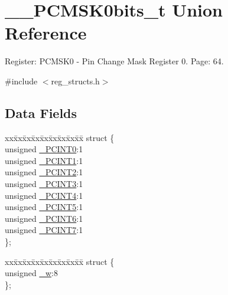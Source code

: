 \hypertarget{union_____p_c_m_s_k0bits__t}{\section{\+\_\+\+\_\+\+P\+C\+M\+S\+K0bits\+\_\+t Union Reference}
\label{union_____p_c_m_s_k0bits__t}
}


Register\+: P\+C\+M\+S\+K0 -\/ Pin Change Mask Register 0. Page\+: 64.  




{\ttfamily \#include $<$reg\+\_\+structs.\+h$>$}

\subsection*{Data Fields}
\begin{DoxyCompactItemize}
\item 
\begin{tabbing}
xx\=xx\=xx\=xx\=xx\=xx\=xx\=xx\=xx\=\kill
struct \{\\
\>unsigned \hyperlink{union_____p_c_m_s_k0bits__t_a4c36533599743b77040f39aa26565e9c}{\_PCINT0}:1\\
\>unsigned \hyperlink{union_____p_c_m_s_k0bits__t_a9d2626d7fe2b7978ad946dfbeefbd3fe}{\_PCINT1}:1\\
\>unsigned \hyperlink{union_____p_c_m_s_k0bits__t_a784b351c789bc209abe8ff338f228b82}{\_PCINT2}:1\\
\>unsigned \hyperlink{union_____p_c_m_s_k0bits__t_afbb36961ce199b7dd0ab29a6f5362998}{\_PCINT3}:1\\
\>unsigned \hyperlink{union_____p_c_m_s_k0bits__t_aa046bde236a4c86e2e9c21973d249e9c}{\_PCINT4}:1\\
\>unsigned \hyperlink{union_____p_c_m_s_k0bits__t_a56d89760d15b21dd0e098c19b4dc8916}{\_PCINT5}:1\\
\>unsigned \hyperlink{union_____p_c_m_s_k0bits__t_a7f3ed66de68e3fd0b7dc7f19ab7c3565}{\_PCINT6}:1\\
\>unsigned \hyperlink{union_____p_c_m_s_k0bits__t_ac895fc43c5e5d26b106c816161738358}{\_PCINT7}:1\\
\}; \\

\end{tabbing}\item 
\begin{tabbing}
xx\=xx\=xx\=xx\=xx\=xx\=xx\=xx\=xx\=\kill
struct \{\\
\>unsigned \hyperlink{union_____p_c_m_s_k0bits__t_a482d4fc2bc2ecc15c1b80c513c699718}{\_w}:8\\
\}; \\

\end{tabbing}\end{DoxyCompactItemize}


